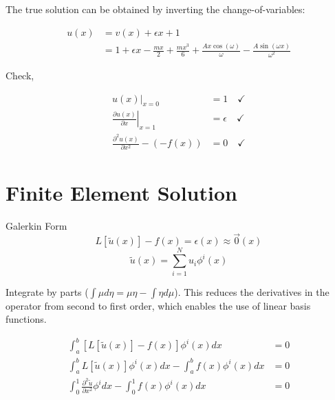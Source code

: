 \documentclass[10pt]{article}
\begin{document}
The true solution can be obtained by inverting the change-of-variables:
    
\begin{equation}
    \label{eqn:u(x)}
    \begin{split}
        u(x) &= v(x) + \epsilon x + 1 \\
        &= 1 + \epsilon x - \frac{m x}{2} + \frac{m x^3}{6} + \frac{A x \cos(\omega)}{\omega} -
        \frac{A \sin(\omega x)}{\omega^2}
    \end{split}
\end{equation}

Check, 

\begin{equation}
    \begin{split}
        \left. u(x) \right|_{x=0} &= 1 \quad \checkmark \\
        \left. \frac{\partial u(x)}{\partial x} \right|_{x=1} &= \epsilon \quad \checkmark \\
        \frac{\partial^2 u(x)}{\partial x^2} - (-f(x)) &= 0 \quad \checkmark
    \end{split}
\end{equation}
    

    
    
\section{Finite Element Solution}
\label{sec:FE_work}

Galerkin Form
\begin{equation}
    \label{eqn:galerkin}
    L[\tilde{u}(x)] - f(x) = \epsilon(x) \approx \vec{0}(x)
\end{equation}
\begin{equation}
    \label{eqn:sumofbases}
    \tilde{u}(x) = \sum_{i=1}^{N}u_i \phi^i(x)
\end{equation}

Integrate by parts ($\int \mu d\eta = \mu \eta - \int \eta d\mu$). This reduces the derivatives in the operator from second to first order, which enables the use of linear basis functions.

\begin{equation}
    \begin{split}
        \int_a^b{\left[ L[\tilde{u}(x)] - f(x) \right] \phi^i(x) dx } &= 0 \\
        \int_a^b L[\tilde{u}(x)] \phi^i(x) dx - \int_a^b f(x) \phi^i(x) dx &= 0 \\
        \int_0^1{ \frac{\partial^2\tilde{u}}{\partial x^2} \phi^i dx } - \int_0^1 f(x) \phi^i(x) dx &= 0 \\
    \end{split}
\end{equation}
\end{document}
